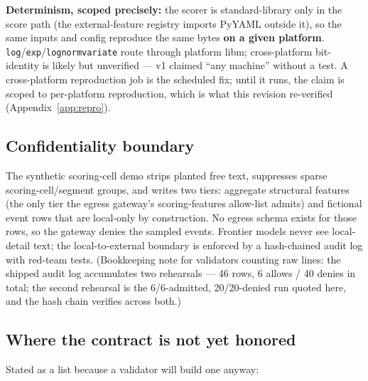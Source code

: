 \documentclass[11pt]{article}
\begin{document}
\textbf{Determinism, scoped precisely:} the scorer is standard-library only
in the score path (the external-feature registry imports PyYAML outside it),
so the same inputs and config reproduce the same bytes \textbf{on a given
platform}. \texttt{log}/\texttt{exp}/\texttt{lognormvariate} route through
platform libm; cross-platform bit-identity is likely but unverified --- v1
claimed ``any machine'' without a test. A cross-platform reproduction job is
the scheduled fix; until it runs, the claim is scoped to per-platform
reproduction, which is what this revision re-verified
(Appendix~\ref{app:repro}).

\subsection{Confidentiality boundary}
\label{sec:confidentiality}

The synthetic scoring-cell demo strips planted free text, suppresses sparse
scoring-cell/segment groups, and writes two tiers: aggregate structural features
(the only tier the egress gateway's scoring-features allow-list admits) and
fictional event rows that are local-only by construction. No egress schema
exists for those rows, so the gateway denies the sampled events.
Frontier models never see local-detail text; the local-to-external boundary
is enforced by a hash-chained audit log with red-team tests. (Bookkeeping
note for validators counting raw lines: the shipped audit log accumulates
two rehearsals --- 46 rows, 6 allows / 40 denies in total; the second
rehearsal is the 6/6-admitted, 20/20-denied run quoted here, and the hash
chain verifies across both.)

\subsection{Where the contract is not yet honored}
\label{sec:gaps}

Stated as a list because a validator will build one anyway:
\end{document}
